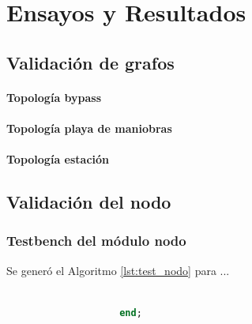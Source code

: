 
\chapter{Ensayos y Resultados} %

\label{Chapter4} %




\section{Validación de grafos}
	
	\subsubsection{Topología bypass}
	\subsubsection{Topología playa de maniobras}
	\subsubsection{Topología estación}
			
\section{Validación del nodo}

	\subsection{Testbench del módulo nodo}
			
			Se generó el Algoritmo \ref{lst:test_nodo} para ...
			
			\begin{lstlisting}[language = vhdl,caption=Testbench del módulo nodo,label={lst:test_nodo}] 
				
					end;
			\end{lstlisting}
			

